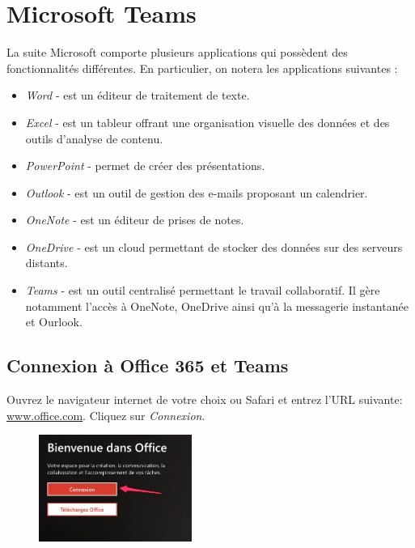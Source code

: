 \chapter{Microsoft Teams}\label{teams1}  


La suite Microsoft comporte plusieurs applications qui possèdent des fonctionnalités différentes. En particulier, on notera les applications suivantes :\\

\begin{itemize}
\item \textit{Word} - est un éditeur de traitement de texte.
\item \textit{Excel} - est un tableur offrant une organisation visuelle des données et des outils d'analyse de contenu.
\item \textit{PowerPoint} - permet de créer des présentations.
\item \textit{Outlook} - est un outil de gestion des e-mails proposant un calendrier.
\item \textit{OneNote} - est un éditeur de prises de notes.
\item \textit{OneDrive} - est un cloud permettant de stocker des données sur des serveurs distants.
\item \textit{Teams} - est un outil centralisé permettant le travail collaboratif. Il gère notamment l'accès à OneNote, OneDrive ainsi qu'à la messagerie instantanée et Ourlook.
\end{itemize} 


\section{Connexion à Office 365 et Teams}

Ouvrez le navigateur internet de votre choix ou Safari et entrez l'URL suivante: \url{www.office.com}. Cliquez sur \textit{Connexion}.

\begin{figure}[H]
\includegraphics[width=5cm]{./images/teams/ecran_office_com_crop}
\centering
\end{figure}

